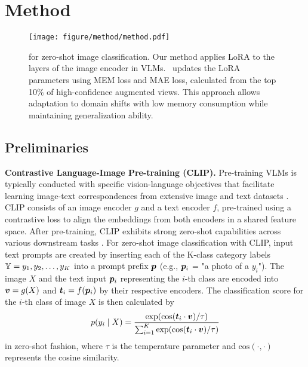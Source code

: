 \section{Method}

\begin{figure*}[!htbp]
\centering
\texttt{[image: figure/method/method.pdf]}
\caption{\textbf{\name} for zero-shot image classification. Our method applies LoRA to the layers of the image encoder in VLMs. \name\ updates the LoRA parameters using MEM loss and MAE loss, calculated from the top 10\% of high-confidence augmented views. This approach allows adaptation to domain shifts with low memory consumption while maintaining generalization ability.}
\label{fig:method}
\end{figure*}

\subsection{Preliminaries}

\textbf{Contrastive Language-Image Pre-training (CLIP).}\hspace{5mm}
Pre-training VLMs is typically conducted with specific vision-language objectives that facilitate learning image-text correspondences from extensive image and text datasets \citep{radford2021learning,yu2022coca,yao2021filip}.
CLIP \citep{radford2021learning} consists of an image encoder $g$ and a text encoder $f$, pre-trained using a contrastive loss to align the embeddings from both encoders in a shared feature space.
After pre-training, CLIP exhibits strong zero-shot capabilities across various downstream tasks \citep{radford2021learning,minderer2022simple,wang2021actionclip,li2022language}.
For zero-shot image classification with CLIP, input text prompts are created by inserting each of the K-class category labels ${\mathbb{Y}} = {y_1, y_2, \dots, y_K}$ into a prompt prefix ${\bm{p}}$ (e.g., ${\bm{p}}_i$ = "a photo of a $y_i$").
The image $X$ and the text input ${\bm{p}}_i$ representing the $i$-th class are encoded into ${\bm{v}}=g(X)$ and ${\bm{t}}_i=f({\bm{p}}_i)$ by their respective encoders. The classification score for the $i$-th class of image $X$ is then calculated by
\begin{equation}
p(y_i\mid X) = \frac{\exp(\text{cos}({\bm{t}}_i \cdot {\bm{v}}) / \tau)}{\sum_{i=1}^{K} \exp(\text{cos}({\bm{t}}_i \cdot {\bm{v}}) / \tau)}
\end{equation}
in zero-shot fashion, where $\tau$ is the temperature parameter and $\text{cos}(\cdot, \cdot)$ represents the cosine similarity.
\newline


